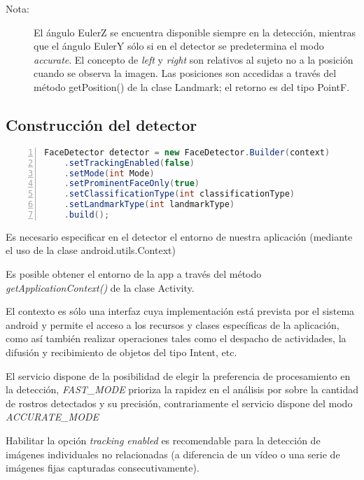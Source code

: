 \begin{description}
\item [{Nota:}] El ángulo EulerZ se encuentra disponible siempre en la
detección, mientras que el ángulo EulerY sólo si en el detector se
predetermina el modo \emph{accurate}. El concepto de \emph{left} y
\emph{right} son relativos al sujeto no a la posición cuando se observa
la imagen. Las posiciones son accedidas a través del método getPosition()
de la clase Landmark; el retorno es del tipo PointF. 
\end{description}

\subsection*{Construcción del detector }

\begin{lstlisting}[language=Java,numbers=left,numberstyle={\tiny},basicstyle={\footnotesize},breaklines=true,captionpos=t,frame=no,keywordstyle={\color{blue}},commentstyle={\color{gray}},stringstyle={\color{red}},numbersep=5pt,emph={label}]
FaceDetector detector = new FaceDetector.Builder(context) 
	.setTrackingEnabled(false) 
	.setMode(int Mode) 
	.setProminentFaceOnly(true) 
	.setClassificationType(int classificationType) 
	.setLandmarkType(int landmarkType) 
	.build(); 
\end{lstlisting}


Es necesario especificar en el detector el entorno de nuestra aplicación
(mediante el uso de la clase android.utils.Context) 

Es posible obtener el entorno de la app a través del método \emph{getApplicationContext()}
de la clase Activity. 

El contexto es sólo una interfaz cuya implementación está prevista
por el sistema android y permite el acceso a los recursos y clases
específicas de la aplicación, como así también realizar operaciones
tales como el despacho de actividades, la difusión y recibimiento
de objetos del tipo Intent, etc. 

El servicio dispone de la posibilidad de elegir la preferencia de
procesamiento en la detección, \emph{FAST\_MODE} prioriza la rapidez
en el análisis por sobre la cantidad de rostros detectados y su precisión,
contrariamente el servicio dispone del modo \emph{ACCURATE\_MODE}

Habilitar la opción \emph{tracking enabled} es recomendable para la
detección de imágenes individuales no relacionadas (a diferencia de
un vídeo o una serie de imágenes fijas capturadas consecutivamente). 

